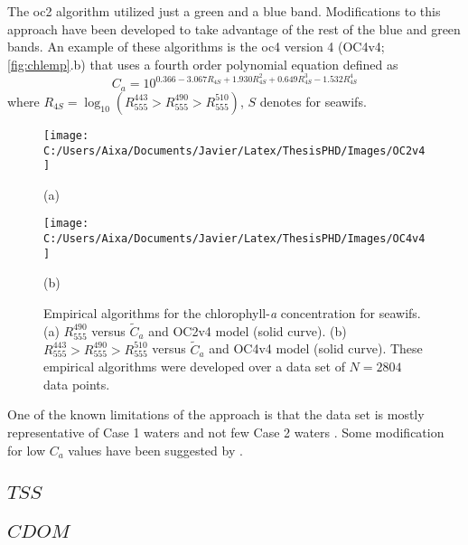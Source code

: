 The \gls{oc2} algorithm utilized just a green and a blue band. Modifications to this approach have been developed to take advantage of the rest of the blue and green bands. An example of these algorithms is the \gls{oc4} version 4 (OC4v4; \autoref{fig:chlemp}.b) that uses a fourth order polynomial equation defined as
\begin{equation}
  C_a = 10^{\displaystyle 0.366-3.067R_{4S}+1.930R_{4S}^2+0.649R_{4S}^3-1.532R_{4S}^4}
\end{equation}
\noindent where $R_{4S}=\log_{10}\left(R_{555}^{443}>R_{555}^{490}>R_{555}^{510}\right)$, $S$ denotes for \gls{seawifs}.

\begin{figure}[htb]
  \begin{minipage}[c]{0.48\linewidth}
    \centering
      \texttt{[image: C:/Users/Aixa/Documents/Javier/Latex/ThesisPHD/Images/OC2v4]}  
    \centerline{(a)}\medskip
  \end{minipage}
  \hfill
  \begin{minipage}[d]{0.48\linewidth}
    \centering
      \texttt{[image: C:/Users/Aixa/Documents/Javier/Latex/ThesisPHD/Images/OC4v4]}
    \centerline{(b)}\medskip
  \end{minipage}
  \caption{Empirical algorithms for the chlorophyll-{\it a} concentration for \gls{seawifs}. (a) $R_{555}^{490}$ versus $\tilde{C}_a$ and OC2v4 model (solid curve). (b) $R_{555}^{443}>R_{555}^{490}>R_{555}^{510}$ versus $\tilde{C}_a$ and OC4v4 model (solid curve). These empirical algorithms were developed over a data set of $N=2804$ data points. \label{fig:chlemp} } 
\end{figure}

One of the known limitations of the approach is that the data set is mostly representative of Case 1 waters and not few Case 2 waters \cite{OReilly2000}. Some modification for low $C_a$ values have been suggested by \cite{Hu:2012fv}.

\subsection{$TSS$}
\subsection{$CDOM$}


